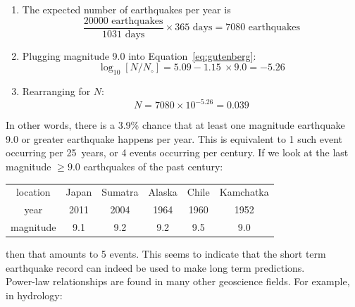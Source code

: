 \begin{enumerate}
\item The expected number of earthquakes per year is
  \[
  \frac{20000\mbox{~earthquakes}}{1031\mbox{~days}}\times{365}\mbox{~days}
  = 7080 \mbox{~earthquakes}
  \]

\item Plugging magnitude 9.0 into Equation~\ref{eq:gutenberg}:
  \[
  \log_{10}[N/N_\circ] = 5.09 -1.15~\times{9.0} = -5.26
  \]

\item Rearranging for $N$:
  \[
  N = 7080 \times 10^{-5.26} = 0.039
  \]
\end{enumerate}

In other words, there is a 3.9\% chance that at least one magnitude
earthquake 9.0 or greater earthquake happens per year. This is
equivalent to 1 such event occurring per 25~years, or 4 events
occurring per century. If we look at the last magnitude $\geq{9.0}$
earthquakes of the past century:

\begin{center}
  \begin{tabular}{c|ccccc}
    location & Japan & Sumatra & Alaska & Chile & Kamchatka \\
    year & 2011 & 2004 & 1964 & 1960 & 1952 \\
    magnitude & 9.1 & 9.2 & 9.2 & 9.5 & 9.0
  \end{tabular}
\end{center}

\noindent then that amounts to 5 events. This seems to indicate that
the short term earthquake record can indeed be used to make long term
predictions.\\

Power-law relationships are found in many other geoscience fields. For
example, in hydrology:

